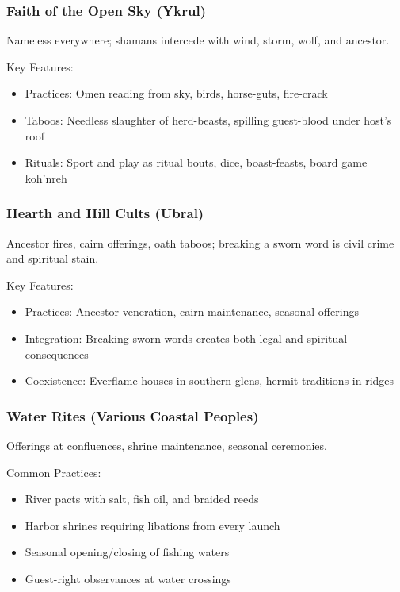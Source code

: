 \subsubsection{Faith of the Open Sky (Ykrul)}
\label{sec:ykrulfaith}

Nameless everywhere; shamans intercede with wind, storm, wolf, and ancestor.

Key Features:
\begin{itemize}
    \item Practices: Omen reading from sky, birds, horse-guts, fire-crack
    \item Taboos: Needless slaughter of herd-beasts, spilling guest-blood under host's roof
    \item Rituals: Sport and play as ritual bouts, dice, boast-feasts, board game koh'nreh
\end{itemize}

\subsubsection{Hearth and Hill Cults (Ubral)}
\label{sec:ubralfaith}

Ancestor fires, cairn offerings, oath taboos; breaking a sworn word is civil crime and spiritual stain.

Key Features:
\begin{itemize}
    \item Practices: Ancestor veneration, cairn maintenance, seasonal offerings
    \item Integration: Breaking sworn words creates both legal and spiritual consequences
    \item Coexistence: Everflame houses in southern glens, hermit traditions in ridges
\end{itemize}

\subsubsection{Water Rites (Various Coastal Peoples)}
\label{sec:waterrites}

Offerings at confluences, shrine maintenance, seasonal ceremonies.

Common Practices:
\begin{itemize}
    \item River pacts with salt, fish oil, and braided reeds
    \item Harbor shrines requiring libations from every launch
    \item Seasonal opening/closing of fishing waters
    \item Guest-right observances at water crossings
\end{itemize}

